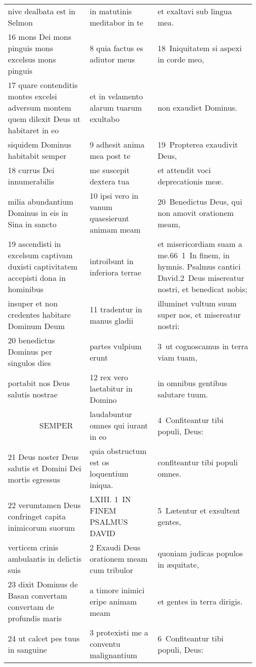 \documentclass{article}
\begin{document}
\begin{longtable}{@{}p{}p{}p{}@{}}
nive dealbata est in Selmon	&	in matutinis meditabor in te	&	et exaltavi sub lingua mea.	\\
16 mons Dei mons pinguis mons excelsus mons pinguis	&	8 quia factus es adiutor meus	&	18 Iniquitatem si aspexi in corde meo,	\\
17 quare contenditis montes excelsi adversum montem quem dilexit Deus ut habitaret in eo	&	et in velamento alarum tuarum exultabo	&	non exaudiet Dominus.	\\
siquidem Dominus habitabit semper	&	9 adhesit anima mea post te	&	19 Propterea exaudivit Deus,	\\
18 currus Dei innumerabilis	&	me suscepit dextera tua	&	et attendit voci deprecationis meæ.	\\
milia abundantium Dominus in eis in Sina in sancto	&	10 ipsi vero in vanum quaesierunt animam meam	&	20 Benedictus Deus, qui non amovit orationem meam,	\\
19 ascendisti in excelsum captivam duxisti captivitatem accepisti dona in hominibus	&	introibunt in inferiora terrae	&	et misericordiam suam a me.66 1 In finem, in hymnis. Psalmus cantici David.2 Deus misereatur nostri, et benedicat nobis;	\\
insuper et non credentes habitare Dominum Deum	&	11 tradentur in manus gladii	&	illuminet vultum suum super nos, et misereatur nostri:	\\
20 benedictus Dominus per singulos dies	&	partes vulpium erunt	&	3 ut cognoscamus in terra viam tuam,	\\
portabit nos Deus salutis nostrae	&	12 rex vero laetabitur in Domino	&	in omnibus gentibus salutare tuum.	\\
    SEMPER	&	laudabuntur omnes qui iurant in eo	&	4 Confiteantur tibi populi, Deus:	\\
21 Deus noster Deus salutis et Domini Dei mortis egressus	&	quia obstructum est os loquentium iniqua.	&	confiteantur tibi populi omnes.	\\
22 verumtamen Deus confringet capita inimicorum suorum	&	LXIII. 1 IN FINEM PSALMUS DAVID	&	5 Lætentur et exsultent gentes,	\\
verticem crinis ambulantis in delictis suis	&	2 Exaudi Deus orationem meam cum tribulor	&	quoniam judicas populos in æquitate,	\\
23 dixit Dominus de Basan convertam convertam de profundis maris	&	a timore inimici eripe animam meam	&	et gentes in terra dirigis.	\\
24 ut calcet pes tuus in sanguine	&	3 protexisti me a conventu malignantium	&	6 Confiteantur tibi populi, Deus:	\\

\end{longtable}
\end{document}
